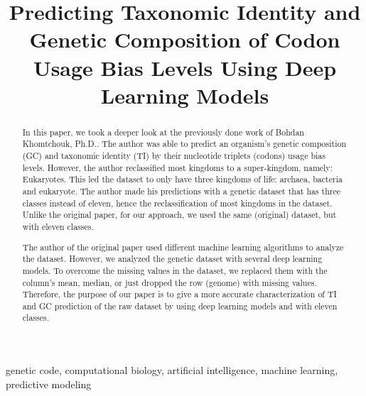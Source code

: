 \documentclass[conference]{IEEEtran}
\begin{document}
\title{Predicting Taxonomic Identity and Genetic Composition of Codon Usage Bias Levels Using Deep Learning Models}

\author{
\and
{}
}

\maketitle



\begin{abstract}
In this paper, we took a deeper look at the previously done work of Bohdan Khomtchouk, Ph.D.\cite{Khomtchouk}. The author was able to predict an organism’s genetic composition (GC) and taxonomic identity (TI) by their nucleotide triplets (codons) usage bias levels. However, the author reclassified most kingdoms to a super-kingdom\cite{Tedersoo}, namely: Eukaryotes. This led the dataset to only have three kingdoms of life: archaea, bacteria and eukaryote. The author made his predictions with a genetic dataset that has three classes instead of eleven, hence the reclassification of most kingdoms in the dataset. Unlike the original paper, for our approach, we used the same (original) dataset, but with eleven classes. 

The author of the original paper used different machine learning algorithms to analyze the dataset. However, we analyzed the genetic dataset with several deep learning models. To overcome the missing values in the dataset, we replaced them with the column's mean, median, or just dropped the row (genome) with missing values. Therefore, the purpose of our paper is to give a more accurate characterization of TI and GC prediction of the raw dataset\cite{Codon Dataset} by using deep learning models and with eleven classes.
\end{abstract}



\begin{IEEEkeywords}
genetic code, computational biology, artificial intelligence, machine learning, predictive modeling
\end{IEEEkeywords}
\end{document}
